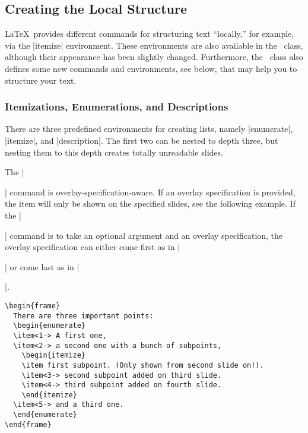 \subsection{Creating the Local Structure}

\LaTeX\ provides different commands for structuring text ``locally,''
for example, via the |itemize| environment. These environments
are also available in the \beamer\ class, although their appearance has
been slightly changed. Furthermore, the \beamer\ class also defines
some new commands and environments, see below, that may help you to
structure your text.


\subsubsection{Itemizations, Enumerations, and Descriptions}

\label{section-enumerate}

There are three predefined environments for creating lists, namely
|enumerate|, |itemize|, and |description|. The first
two can be nested to depth three, but nesting them to this depth
creates totally unreadable slides.

The |\item| command is overlay-specification-aware. If an overlay
specification is provided, the item will only be shown on the
specified slides, see the following example. If the |\item|
command is to take an optional argument and an overlay specification,
the overlay specification can either come first as in |\item<1>[Cat]|
or come last as in |\item[Cat]<1>|.

\begin{verbatim}
\begin{frame}
  There are three important points:
  \begin{enumerate}
  \item<1-> A first one,
  \item<2-> a second one with a bunch of subpoints,
    \begin{itemize}
    \item first subpoint. (Only shown from second slide on!).
    \item<3-> second subpoint added on third slide.
    \item<4-> third subpoint added on fourth slide.
    \end{itemize}
  \item<5-> and a third one.
  \end{enumerate}
\end{frame}
\end{verbatim}


